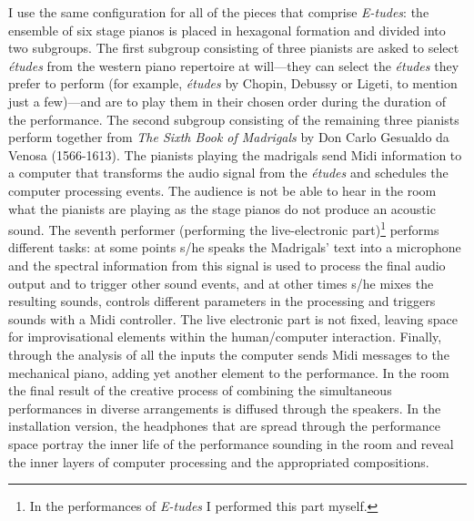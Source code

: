 I use the same configuration for all of the pieces that comprise \emph{E-tudes}: the ensemble of six stage pianos is placed in hexagonal formation and divided into two subgroups. The first subgroup consisting of three pianists are asked to select \emph{\'{e}tudes} from the western piano repertoire at will---they can select the \emph{\'{e}tudes} they prefer to perform (for example, \emph{\'{e}tudes} by Chopin, Debussy or Ligeti, to mention just a few)---and are to play them in their chosen order during the duration of the performance. The second subgroup consisting of the remaining three pianists perform together from \emph{The Sixth Book of Madrigals} by Don Carlo Gesualdo da Venosa (1566-1613). The pianists playing the madrigals send Midi information to a computer that transforms the audio signal from the \emph{\'{e}tudes} and schedules the computer processing events. The audience is not be able to hear in the room what the pianists are playing as the stage pianos do not produce an acoustic sound. The seventh performer (performing the live-electronic part)\footnote{In the performances of \emph{E-tudes} I performed this part myself.} performs different tasks: at some points s/he speaks the Madrigals' text into a microphone and the spectral information from this signal is used to process the final audio output and to trigger other sound events, and at other times s/he mixes the resulting sounds, controls different parameters in the processing and  triggers sounds with a Midi controller. The live electronic part is not fixed, leaving space for improvisational elements within the human/computer interaction. Finally, through the analysis of all the inputs the computer sends Midi messages to the mechanical piano, adding yet another element to the performance. In the room the final result of the creative process of combining the simultaneous performances in diverse arrangements is diffused through the speakers. In the installation version, the headphones that are spread through the performance space portray the inner life of the performance sounding in the room and reveal the inner layers of computer processing and the appropriated compositions.

